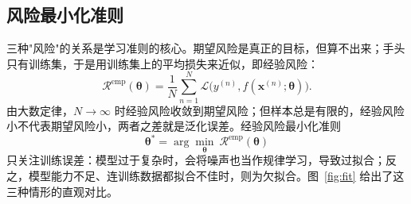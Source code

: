 \documentclass[UTF8,a4paper,12pt]{ctexart}
\numberwithin{equation}{section}
\begin{document}
\subsection{风险最小化准则}

三种"风险"的关系是学习准则的核心。期望风险是真正的目标，但算不出来；手头只有训练集，于是用训练集上的平均损失来近似，即经验风险：
\begin{equation}\label{eq:2.10}
\mathcal{R}^{\mathrm{emp}}(\bm{\theta})
=\frac{1}{N}\sum_{n=1}^{N}
\mathcal{L}\bigl(y^{(n)},f(\bm{x}^{(n)};\bm{\theta})\bigr).
\end{equation}
由大数定律，$N\to\infty$ 时经验风险收敛到期望风险；但样本总是有限的，经验风险小不代表期望风险小，两者之差就是泛化误差。经验风险最小化准则
\begin{equation}\label{eq:2.11}
\bm{\theta}^{*}=\arg\min_{\bm{\theta}}\ \mathcal{R}^{\mathrm{emp}}(\bm{\theta})
\end{equation}
只关注训练误差：模型过于复杂时，会将噪声也当作规律学习，导致过拟合；反之，模型能力不足、连训练数据都拟合不佳时，则为欠拟合。图~\ref{fig:fit} 给出了这三种情形的直观对比。
\end{document}
